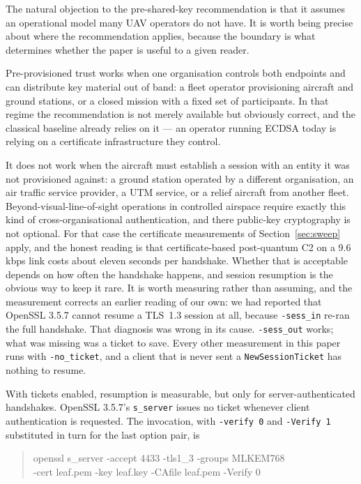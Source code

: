 \documentclass[drones,article,submit,pdftex,moreauthors]{Definitions/mdpi}
\newcommand{\kbps}{kbps}
\newcommand{\tls}{TLS}
\begin{document}
The natural objection to the pre-shared-key recommendation is that it
assumes an operational model many UAV operators do not have. It is worth
being precise about where the recommendation applies, because the
boundary is what determines whether the paper is useful to a given
reader.

Pre-provisioned trust works when one organisation controls both
endpoints and can distribute key material out of band: a fleet operator
provisioning aircraft and ground stations, or a closed mission with a
fixed set of participants. In that regime the recommendation is not
merely available but obviously correct, and the classical baseline
already relies on it --- an operator running ECDSA today is relying on a
certificate infrastructure they control.

It does not work when the aircraft must establish a session with an
entity it was not provisioned against: a ground station operated by a
different organisation, an air traffic service provider, a UTM service,
or a relief aircraft from another fleet. Beyond-visual-line-of-sight
operations in controlled airspace require exactly this kind of
cross-organisational authentication, and there public-key cryptography
is not optional. For that case the certificate measurements of
Section~\ref{sec:sweep} apply, and the honest reading is that
certificate-based post-quantum C2 on a 9.6\,\kbps{} link costs about
eleven seconds per handshake. Whether that is acceptable depends on how
often the handshake happens, and session resumption is the obvious way
to keep it rare. It is worth measuring rather than assuming, and the
measurement corrects an earlier reading of our own: we had reported that
OpenSSL 3.5.7 cannot resume a \tls{}~1.3 session at all, because
\texttt{-sess\_in} re-ran the full handshake. That diagnosis was wrong in
its cause. \texttt{-sess\_out} works; what was missing was a ticket to
save. Every other measurement in this paper runs with
\texttt{-no\_ticket}, and a client that is never sent a
\texttt{NewSessionTicket} has nothing to resume.

With tickets enabled, resumption is measurable, but only for
server-authenticated handshakes. OpenSSL 3.5.7's \texttt{s\_server}
issues no ticket whenever client authentication is requested. The
invocation, with \texttt{-verify 0} and \texttt{-Verify 1} substituted
in turn for the last option pair, is

\begin{quote}
\raggedright\ttfamily
openssl s\_server -accept 4433 -tls1\_3 -groups MLKEM768\\
-cert leaf.pem -key leaf.key -CAfile leaf.pem -Verify 0
\end{quote}
\end{document}

